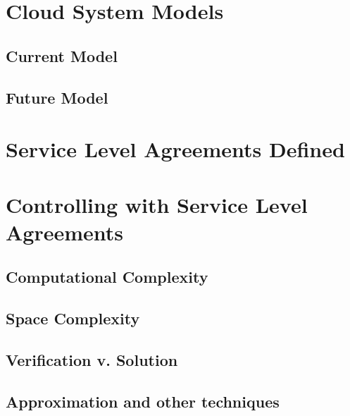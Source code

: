\section{Cloud System Models}

\subsection{Current Model}

\subsection{Future Model}

\section{Service Level Agreements Defined}

\section{Controlling with Service Level Agreements}

\subsection{Computational Complexity}

\subsection{Space Complexity}

\subsection{Verification v. Solution}

\subsection{Approximation and other techniques}





